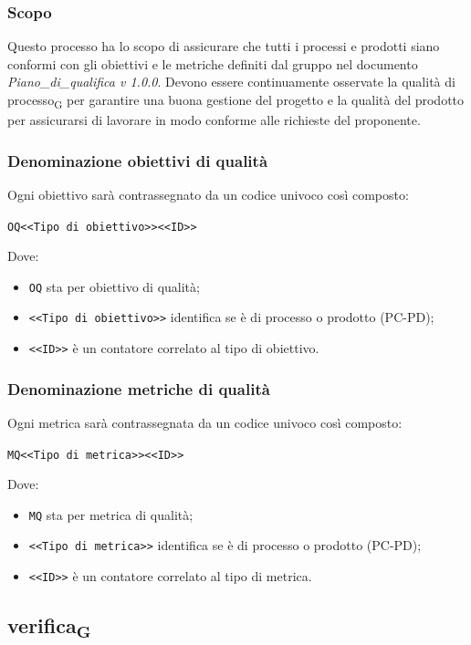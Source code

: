 \subsubsection{Scopo}
Questo processo ha lo scopo di assicurare che tutti i processi e prodotti siano conformi con gli obiettivi e le metriche definiti dal gruppo nel documento \textit{Piano\_di\_qualifica v 1.0.0}. 
Devono essere continuamente osservate la qualità di processo\textsubscript{G} per garantire una buona gestione del progetto e la qualità del prodotto per assicurarsi di lavorare in modo conforme alle richieste del proponente.
\subsubsection{Denominazione obiettivi di qualità}
Ogni obiettivo sarà contrassegnato da un codice univoco così composto:
\begin{center}
	\verb|OQ<<Tipo di obiettivo>><<ID>>|
\end{center}
Dove:
\begin{itemize}
	\item \verb|OQ| sta per obiettivo di qualità;
	\item \verb|<<Tipo di obiettivo>>| identifica se è di processo o prodotto (PC-PD);
	\item \verb|<<ID>>| è un contatore correlato al tipo di obiettivo.
\end{itemize}
\subsubsection{Denominazione metriche di qualità}
Ogni metrica sarà contrassegnata da un codice univoco così composto:
\begin{center}
	\verb|MQ<<Tipo di metrica>><<ID>>|
\end{center}
Dove:
\begin{itemize}
	\item \verb|MQ| sta per metrica di qualità;
	\item \verb|<<Tipo di metrica>>| identifica se è di processo o prodotto (PC-PD);
	\item \verb|<<ID>>| è un contatore correlato al tipo di metrica.
\end{itemize}
\subsection{verifica\textsubscript{G}}
